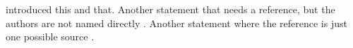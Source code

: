 \citet{bishop_pattern_2019} introduced this and that. Another statement that needs a reference, but the authors are not named directly \citep{bishop_pattern_2019}. Another statement where the reference is just one possible source \citep[see, e.g.,][]{bishop_pattern_2019}. 